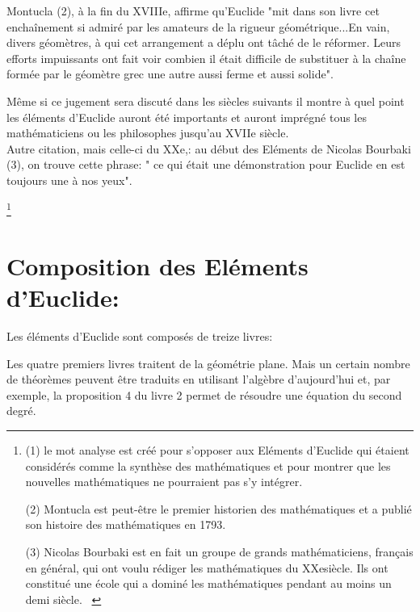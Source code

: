 \documentclass[a4paper, 12pt, twoside]{book}
\begin{document}
   Montucla (2), à la fin du XVIIIe, affirme qu'Euclide "mit dans son livre cet enchaînement si admiré par les amateurs de la rigueur géométrique...En vain, divers géomètres, à qui cet arrangement a déplu ont tâché de le réformer. Leurs efforts impuissants ont fait voir combien il était difficile de substituer à la chaîne formée par le géomètre grec une autre aussi ferme et aussi solide". 

  
 Même si ce jugement sera discuté dans les siècles suivants il montre à quel point  les éléments d'Euclide auront été importants et auront imprégné tous les mathématiciens ou les philosophes jusqu'au XVIIe siècle.\\
 
 Autre citation, mais celle-ci du XXe,: au début des Eléments de Nicolas Bourbaki (3), on trouve cette phrase: " ce qui était une démonstration pour Euclide en est toujours une à nos yeux".\   


  

   
    \footnote{(1) le mot analyse est créé pour s'opposer aux Eléments d'Euclide qui étaient considérés comme la synthèse des mathématiques et pour montrer que les nouvelles mathématiques ne pourraient pas s'y intégrer.
    
  (2) Montucla est peut-être le premier historien des mathématiques et a publié son histoire des mathématiques en 1793.
  
  (3) Nicolas Bourbaki est en fait un groupe de grands mathématiciens, français en général, qui ont voulu rédiger les mathématiques du XXesiècle. Ils ont constitué une école qui a dominé les mathématiques pendant au moins un demi siècle. \
  
    }  
  
 

 
 
 \newpage  \section{Composition des Eléments d'Euclide:}
  
    
    
    Les éléments d'Euclide sont composés de treize livres:\
    
  
  
  
 
 
     

  
 
 
 

    Les quatre premiers livres traitent de la géométrie plane. Mais un certain nombre de théorèmes peuvent être traduits en utilisant l'algèbre d'aujourd'hui et, par exemple,  la proposition 4 du livre 2 permet de résoudre une équation du second degré.\
   
\end{document}
